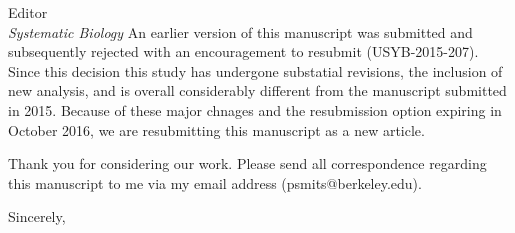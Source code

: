\documentclass{letter}
\begin{document}
\begin{letter}{Editor \\ \textit{Systematic Biology}}
  An earlier version of this manuscript was submitted and subsequently rejected with an encouragement to resubmit (USYB-2015-207). Since this decision this study has undergone substatial revisions, the inclusion of new analysis, and is overall considerably different from the manuscript submitted in 2015. Because of these major chnages and the resubmission option expiring in October 2016, we are resubmitting this manuscript as a new article.

  Thank you for considering our work. Please send all correspondence regarding this manuscript to me via my email address (psmits@berkeley.edu).

  \closing{Sincerely,}


\end{letter}
\end{document}
